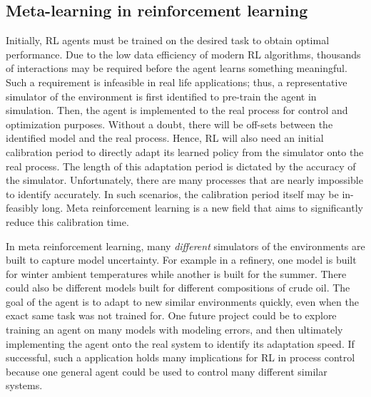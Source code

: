 \subsection{Meta-learning in reinforcement learning}
Initially, RL agents must be trained on the desired task to obtain optimal performance.  Due to the low data efficiency of modern RL algorithms, thousands of interactions may be required before the agent learns something meaningful.  Such a requirement is infeasible in real life applications; thus, a representative simulator of the environment is first identified to pre-train the agent in simulation.  Then, the agent is implemented to the real process for control and optimization purposes.  Without a doubt, there will be off-sets between the identified model and the real process. Hence, RL will also need an initial calibration period to directly adapt its learned policy from the simulator onto the real process.  The length of this adaptation period is dictated by the accuracy of the simulator.  Unfortunately, there are many processes that are nearly impossible to identify accurately.  In such scenarios, the calibration period itself may be in-feasibly long. Meta reinforcement learning is a new field that aims to significantly reduce this calibration time.

In meta reinforcement learning, many \textit{different} simulators of the environments are built to capture model uncertainty.  For example in a refinery, one model is built for winter ambient temperatures while another is built for the summer.  There could also be different models built for different compositions of crude oil.  The goal of the agent is to adapt to new similar environments quickly, even when the exact same task was not trained for.  One future project could be to explore training an agent on many models with modeling errors, and then ultimately implementing the agent onto the real system to identify its adaptation speed.  If successful, such a application holds many implications for RL in process control because one general agent could be used to control many different similar systems.